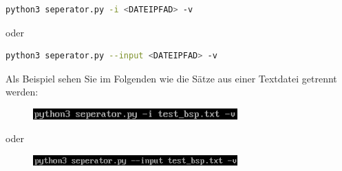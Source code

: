 \documentclass[12pt]{scrartcl}
\begin{document}
\begin{lstlisting}[language=bash]
python3 seperator.py -i <DATEIPFAD> -v 
\end{lstlisting}\begin{center}
oder 
\end{center}
\begin{lstlisting}[language=bash]
python3 seperator.py --input <DATEIPFAD> -v
\end{lstlisting}
Als Beispiel sehen Sie im Folgenden wie die Sätze aus einer Textdatei getrennt werden:
\begin{figure}[htbp]
\centering
\includegraphics[width=0.7\textwidth]{ersteSchritteSaetzeTrennen001}\par\vspace{0.25cm}
\label{fig:ersteSchritteSaetzeTrennen001}
\end{figure}
\begin{center}
oder
\end{center}
\begin{figure}[htbp]
\centering
\includegraphics[width=0.7\textwidth]{ersteSchritteSaetzeTrennen002}\par\vspace{0.25cm}
\label{fig:ersteSchritteSaetzeTrennen002}
\end{figure}

\newpage
\end{document}
